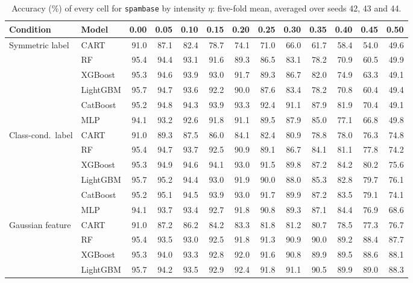 \begin{table}[p]
\centering
\tiny
\setlength{\tabcolsep}{2.6pt}
\caption{Accuracy (\%) of every cell for \texttt{spambase} by intensity $\eta$: five-fold mean, averaged over seeds 42, 43 and 44.}
\label{tab:grid_spambase}
\begin{tabular}{@{}llrrrrrrrrrrr@{}}
\toprule
Condition & Model & 0.00 & 0.05 & 0.10 & 0.15 & 0.20 & 0.25 & 0.30 & 0.35 & 0.40 & 0.45 & 0.50 \\
\midrule
Symmetric label & CART & 91.0 & 87.1 & 82.4 & 78.7 & 74.1 & 71.0 & 66.0 & 61.7 & 58.4 & 54.0 & 49.6 \\
 & RF & 95.4 & 94.4 & 93.1 & 91.6 & 89.3 & 86.5 & 83.1 & 78.2 & 70.9 & 60.5 & 49.9 \\
 & XGBoost & 95.3 & 94.6 & 93.9 & 93.0 & 91.7 & 89.3 & 86.7 & 82.0 & 74.9 & 63.3 & 49.1 \\
 & LightGBM & 95.7 & 94.7 & 93.6 & 92.2 & 90.0 & 87.6 & 83.4 & 78.2 & 70.8 & 60.4 & 49.4 \\
 & CatBoost & 95.2 & 94.8 & 94.3 & 93.9 & 93.3 & 92.4 & 91.1 & 87.9 & 81.9 & 70.4 & 49.1 \\
 & MLP & 94.1 & 93.2 & 92.6 & 91.8 & 91.1 & 89.5 & 87.9 & 85.0 & 77.1 & 66.8 & 49.8 \\
\midrule
Class-cond.\ label & CART & 91.0 & 89.3 & 87.5 & 86.0 & 84.1 & 82.4 & 80.9 & 78.8 & 78.0 & 76.3 & 74.8 \\
 & RF & 95.4 & 94.7 & 93.7 & 92.5 & 90.9 & 89.1 & 86.7 & 84.1 & 81.1 & 77.8 & 74.2 \\
 & XGBoost & 95.3 & 94.9 & 94.6 & 94.1 & 93.0 & 91.5 & 89.8 & 87.2 & 84.2 & 80.2 & 75.6 \\
 & LightGBM & 95.7 & 95.2 & 94.4 & 93.0 & 91.9 & 90.0 & 88.0 & 85.3 & 82.8 & 79.7 & 76.1 \\
 & CatBoost & 95.2 & 95.1 & 94.5 & 93.9 & 93.0 & 91.7 & 89.9 & 87.2 & 83.5 & 79.1 & 74.1 \\
 & MLP & 94.1 & 93.7 & 93.4 & 92.7 & 91.8 & 90.8 & 89.3 & 87.1 & 84.4 & 76.9 & 68.6 \\
\midrule
Gaussian feature & CART & 91.0 & 87.2 & 86.2 & 84.2 & 83.3 & 81.8 & 81.2 & 80.7 & 78.5 & 77.3 & 76.7 \\
 & RF & 95.4 & 93.5 & 93.0 & 92.5 & 91.8 & 91.3 & 90.9 & 90.0 & 89.2 & 88.4 & 87.7 \\
 & XGBoost & 95.3 & 94.0 & 93.3 & 92.8 & 92.0 & 91.6 & 90.8 & 89.9 & 89.5 & 88.6 & 88.1 \\
 & LightGBM & 95.7 & 94.2 & 93.5 & 92.9 & 92.4 & 91.8 & 91.1 & 90.5 & 89.9 & 89.0 & 88.3 \\

\end{tabular}
\end{table}
